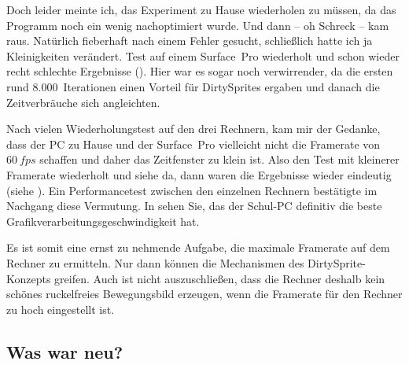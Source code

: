 
Doch leider meinte ich, das Experiment zu Hause wiederholen zu müssen, da das Programm noch ein wenig nachoptimiert wurde. Und dann -- oh Schreck -- kam  raus. Natürlich fieberhaft nach einem Fehler gesucht, schließlich hatte ich ja Kleinigkeiten verändert. Test auf einem Surface~Pro wiederholt und schon wieder recht schlechte Ergebnisse (). Hier war es sogar noch verwirrender, da die ersten rund 8.000~Iterationen einen Vorteil für DirtySprites ergaben und danach die Zeitverbräuche sich angleichten. 

Nach vielen Wiederholungstest auf den drei Rechnern, kam mir der Gedanke, dass der PC zu Hause und der Surface~Pro vielleicht nicht die Framerate von $60~fps$ schaffen und daher das Zeitfenster zu klein ist. Also den Test mit kleinerer Framerate wiederholt und siehe da, dann waren die Ergebnisse wieder eindeutig (siehe ). Ein Performancetest zwischen den einzelnen Rechnern bestätigte im Nachgang diese Vermutung. In  sehen Sie, das der Schul-PC definitiv die beste Grafikverarbeitungsgeschwindigkeit hat.





Es ist somit eine ernst zu nehmende Aufgabe, die maximale Framerate auf dem Rechner zu ermitteln. Nur dann können die Mechanismen des DirtySprite-Konzepts greifen. Auch ist nicht auszuschließen, dass die Rechner deshalb kein schönes ruckelfreies Bewegungsbild erzeugen, wenn die Framerate für den Rechner zu hoch eingestellt ist.

\subsection*{Was war neu?}


